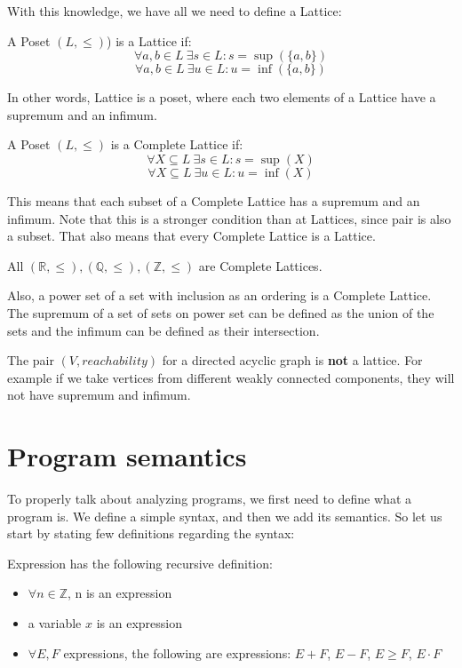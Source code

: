 With this knowledge, we have all we need to define a Lattice:
\begin{defn}[Lattice]
    A Poset $(L, \leq)$) is a Lattice if:
    \[\forall a, b \in L \: \exists s \in L: s = \sup(\{a,b\})\]
    \[\forall a, b \in L \: \exists u \in L: u = \inf(\{a,b\})\]
\end{defn}

In other words, Lattice is a poset, where each two elements of a Lattice have a supremum and an infimum.

\begin{defn}
    A Poset $(L, \leq)$ is a Complete Lattice if:
    \[\forall X \subseteq L \: \exists s \in L: s = \sup(X)\]
    \[\forall X \subseteq L \: \exists u \in L: u = \inf(X)\]
\end{defn}

This means that each subset of a Complete Lattice has a supremum and an infimum.
Note that this is a stronger condition than at Lattices, since pair is also a subset.
That also means that every Complete Lattice is a Lattice.

\begin{example}
    All $(\mathbb{R}, \leq), (\mathbb{Q}, \leq), (\mathbb{Z}, \leq)$ are Complete Lattices. %

    Also, a power set of a set with inclusion as an ordering is a Complete Lattice.
    The supremum of a set of sets on power set can be defined as the union of the sets and the infimum can be defined as
    their intersection.

    The pair $(V, reachability)$ for a directed acyclic graph is \textbf{not} a lattice.
    For example if we take vertices from different weakly connected components, they will not have supremum and infimum.
\end{example}


\section{Program semantics}

To properly talk about analyzing programs, we first need to define what a program is.
We define a simple syntax, and then we add its semantics.
So let us start by stating few definitions regarding the syntax:

\begin{defn}[Expression]
    Expression has the following recursive definition:
    \begin{itemize}
        \item $\forall n \in \mathbb{Z}$, n is an expression
        \item a variable $x$ is an expression
        \item $\forall E, F$ expressions, the following are expressions: $E+F$, $E-F$, $E \geq F$, $E \cdot F$
    \end{itemize}
\end{defn}

